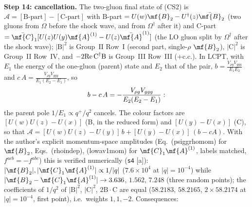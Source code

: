 \medskip
\noindent\textbf{Step 14: cancellation.} The two-gluon final state of (CS2) is $\mathcal{A}=[\text{B-part}]-[\text{C-part}]$ with B-part $=U(w)\mf{B}_{2}-U^{\dagger}(z)\bar{\mf{B}}_{2}$ (two gluons from $\Omega$ before the shock wave, and from $\Omega^{\dagger}$ after it) and C-part $=\bar{\mf{C}}_{1}[U(z)U(y)\mf{A}^{(1)}-U(z)\bar{\mf{A}}^{(1)}]$ (the LO gluon split by $\Omega^{\dagger}$ after the shock wave); $|\text{B}|^{2}$ is Group~II Row~I (second part, single-$\rho$ $\mf{B}_{2}$), $|\text{C}|^{2}$ is Group~II Row~IV, and $-2{\rm Re}\,\text{C}^{\dagger}\text{B}$ is Group~III Row~III ($+$c.c.). In LCPT, with $E_{1}$ the energy of the one-gluon (parent) state and $E_{2}$ that of the pair, $b=\frac{V_{\rho g}V_{ggg}}{E_{1}E_{2}}$ and $c\,A=\frac{V_{\rho g}V_{ggg}}{E_{1}(E_{2}-E_{1})}$, so
\begin{align}
b-c\,A=-\frac{V_{\rho g}V_{ggg}}{E_{2}(E_{2}-E_{1})}:
\notag
\end{align}
the parent pole $1/E_{1}\propto q^{+}/q^{2}$ cancels. The colour factors are $[U(w)U(z)-U(x)]$ (B, in the reduced form) and $[U(y)-U(x)]$ (C), so that $\mathcal{A}=[U(w)U(z)-U(y)]\,b+[U(y)-U(x)]\,(b-cA)$. With the author's explicit momentum-space amplitudes (Eq.~(psiggrhomom) for $\mf{B}_{2}$, Eqs.~(rhoindep), (lowav1mom) for $\mf{C}_{1}\mf{A}^{(1)}$, labels matched, $f^{acb}=-f^{abc}$) this is verified numerically (\texttt{s4} [a]): $|\mf{B}_{2}|,|\mf{C}_{1}\mf{A}^{(1)}|\propto1/|q|$ ($7.6\times10^{4}$ at $|q|=10^{-4}$) while $|\mf{B}_{2}-\mf{C}_{1}\mf{A}^{(1)}|\to3.636$, $1.562$, $7.248$ (three random points); the coefficients of $1/q^{2}$ of $|\text{B}|^{2}$, $|\text{C}|^{2}$, $2\text{B}\cdot\text{C}$ are equal ($58.2183$, $58.2165$, $2\times58.2174$ at $|q|=10^{-4}$, first point), i.e.\ weights $1,1,-2$. Consequences:
